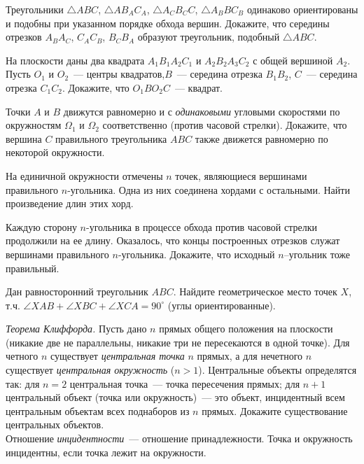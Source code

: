 \begin{problems}

\item
Треугольники
$\triangle A B C$,
$\triangle A B_A C_A$,
$\triangle A_C B_C C$,
$\triangle A_B B C_B$
одинаково ориентированы и подобны при указанном порядке обхода вершин.
Докажите, что середины отрезков
$A_B A_C$, $C_A C_B$, $B_C B_A$ образуют треугольник, подобный $\triangle ABC$.

\item
На плоскости даны два квадрата $A_1 B_1 A_2 C_1$ и $A_2 B_2 A_3 C_2$ с общей
вершиной $A_2$.
Пусть $O_1$ и $O_2$~--- центры квадратов,$B$~--- середина отрезка $B_1 B_2$,
$C$~--- середина отрезка $C_1 C_2$.
Докажите, что $O_1 B O_2 C$~--- квадрат.

\item
Точки $A$ и $B$ движутся равномерно и с \emph{одинаковыми} угловыми скоростями
по окружностям $\Omega_1$ и $\Omega_2$ соответственно (против часовой стрелки).
Докажите, что вершина $C$ правильного треугольника $ABC$ также движется
равномерно по некоторой окружности.

\item
На единичной окружности отмечены $n$ точек, являющиеся вершинами правильного
$n$-угольника.
Одна из них соединена хордами с остальными.
Найти произведение длин этих хорд.

\item
Каждую сторону $n$-угольника в процессе обхода против часовой стрелки
продолжили на ее длину.
Оказалось, что концы построенных отрезков служат вершинами правильного
$n$-угольника.
Докажите, что исходный $n$--угольник тоже правильный.

\itemx{*}
Дан равносторонний треугольник $ABC$.
Найдите геометрическое место точек $X$, т.ч.
$\angle XAB + \angle XBC + \angle XCA = 90^{\circ}$
(углы ориентированные).

\itemx{*}
\emph{Теорема Клиффорда.}
Пусть дано $n$ прямых общего положения на плоскости
(никакие две не параллельны, никакие три не пересекаются в одной точке).
Для четного $n$ существует \emph{центральная точка} $n$ прямых, а для нечетного
$n$ существует \emph{центральная окружность} ($n > 1$).
Центральные объекты определятся так: для $n = 2$ центральная точка~--- точка
пересечения прямых; для $n + 1$ центральный объект (точка или окружность)~---
это объект, инцидентный всем центральным объектам всех поднаборов из $n$
прямых.
Докажите существование центральных объектов.
\\
Отношение \emph{инцидентности}~--- отношение принадлежности.
Точка и окружность инцидентны, если точка лежит на окружности.

\end{problems}

